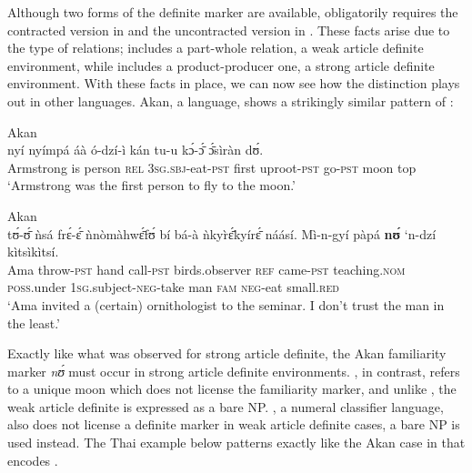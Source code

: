 \documentclass[output=paper,
modfonts
]{langscibook}
\begin{document}
Although two forms of the definite marker are available,  obligatorily requires the contracted version in  and the uncontracted version in . These facts arise due to the type of  relations;  includes a part-whole relation, a weak article definite environment, while  includes a product-producer one, a strong article definite environment. With these  facts in place, we can now see how the distinction plays out in other languages. Akan, a  language, shows a strikingly similar pattern of : 

\begin{exe} 
\ex \label{ex:irani:16} Akan \\  {ny{\'i}} {ny{\'i}mp{\'a}} {{\'a}{\`a}} {{\'o}-dz{\'i}-{\`i}} {k{\'a}n} {tu-u} {k{\'ɔ}-{\'{\={ɔ}}}} {{\'{\={ɔ}}}s{\`i}r{\`a}n} {d{\'ʊ}}.\\
Armstrong is person \textsc{rel} 3\textsc{sg}.\textsc{sbj}-eat-\textsc{pst} first uproot-\textsc{pst} go-\textsc{pst} moon top\\
\trans `Armstrong was the first person to fly to the moon.’ \citep[39]{ArkohMatthewson2013}

\ex\label{ex:irani:17} Akan \\  {t{\'ʊ}-{\'{\={ʊ}}}} {{\`n}s{\'a}} {fr{\'ɛ}-{\'{\={ɛ}}}} {{\`n}n{\`o}m{\`a}hw{\'{\={ɛ}}}f{\'ʊ}} {b{\'i}} {b{\'a}-{\`a}} {{\`n}ky{\`r}{\'{\={ɛ}}}ky{\'i}r{\'{\={ɛ}}}} {n{\'a}{\'a}s{\'i}}. {M{\`i}-n-gy{\'i}} {p{\`a}p{\'a}} {\textbf{n{\'ʊ}}} {`n-dz{\'i}} {k{\`i}ts{\`i}k{\`i}ts{\'i}}. \\
Ama throw-\textsc{pst} hand call-\textsc{pst} birds.observer \textsc{ref} came-\textsc{pst} teaching.\textsc{nom} \textsc{poss}.under 1\textsc{sg}.subject-\textsc{neg}-take man \textsc{fam} \textsc{neg}-eat small.\textsc{red}\\
\trans `Ama invited a (certain) ornithologist to the seminar. I don’t trust the man in the least.' \citep[52]{ArkohMatthewson2013}
\end{exe}

Exactly like what was observed for  strong article definite, the Akan familiarity marker \textit{n{\'ʊ}} must occur in strong article definite environments. , in contrast, refers to a unique moon which does not license the familiarity marker, and unlike , the weak article definite is expressed as a bare NP. , a numeral classifier language, also does not license a definite marker in weak article definite cases, a bare NP is used instead. The Thai example below patterns exactly like the Akan case in  that encodes . 
\end{document}
